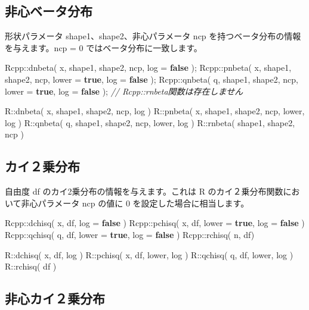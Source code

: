 \documentclass[]{book}
\newenvironment{Shaded}{\begin{snugshade}}{\end{snugshade}}
\newcommand{\CommentTok}[1]{\textcolor[rgb]{0.56,0.35,0.01}{\textit{#1}}}
\newcommand{\KeywordTok}[1]{\textcolor[rgb]{0.13,0.29,0.53}{\textbf{#1}}}
\newcommand{\NormalTok}[1]{#1}
\begin{document}
\subsection{非心ベータ分布}

形状パラメータ shape1、shape2、非心パラメータ ncp を持つベータ分布の情報を与えます。ncp = 0 ではベータ分布に一致します。

\begin{Shaded}
\begin{Highlighting}[]
\NormalTok{Rcpp::dnbeta( x, shape1, shape2, ncp,               log = }\KeywordTok{false}\NormalTok{ );}
\NormalTok{Rcpp::pnbeta( x, shape1, shape2, ncp, lower = }\KeywordTok{true}\NormalTok{, log = }\KeywordTok{false}\NormalTok{ );}
\NormalTok{Rcpp::qnbeta( q, shape1, shape2, ncp, lower = }\KeywordTok{true}\NormalTok{, log = }\KeywordTok{false}\NormalTok{ );}
\CommentTok{// Rcpp::rnbeta関数は存在しません}

\NormalTok{R::dnbeta( x, shape1, shape2, ncp,        log )}
\NormalTok{R::pnbeta( x, shape1, shape2, ncp, lower, log )}
\NormalTok{R::qnbeta( q, shape1, shape2, ncp, lower, log )}
\NormalTok{R::rnbeta(    shape1, shape2, ncp )}
\end{Highlighting}
\end{Shaded}

\subsection{カイ２乗分布}

自由度 df のカイ2乗分布の情報を与えます。これは R のカイ２乗分布関数において非心パラメータ ncp の値に 0 を設定した場合に相当します。

\begin{Shaded}
\begin{Highlighting}[]
\NormalTok{Rcpp::dchisq( x, df,               log = }\KeywordTok{false}\NormalTok{ )}
\NormalTok{Rcpp::pchisq( x, df, lower = }\KeywordTok{true}\NormalTok{, log = }\KeywordTok{false}\NormalTok{ )}
\NormalTok{Rcpp::qchisq( q, df, lower = }\KeywordTok{true}\NormalTok{, log = }\KeywordTok{false}\NormalTok{ )}
\NormalTok{Rcpp::rchisq( n, df)}

\NormalTok{R::dchisq( x, df,        log )}
\NormalTok{R::pchisq( x, df, lower, log )}
\NormalTok{R::qchisq( q, df, lower, log )}
\NormalTok{R::rchisq(    df )}
\end{Highlighting}
\end{Shaded}

\subsection{非心カイ２乗分布}
\end{document}
